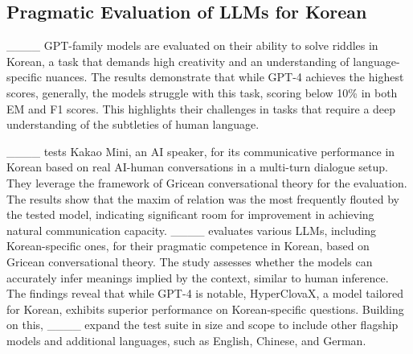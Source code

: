 \subsection*{Pragmatic Evaluation of LLMs for Korean}


____ GPT-family models are evaluated on their ability to solve riddles in Korean, a task that demands high creativity and an understanding of language-specific nuances. The results demonstrate that while GPT-4 achieves the highest scores, generally, the models struggle with this task, scoring below 10\% in both EM and F1 scores. This highlights their challenges in tasks that require a deep understanding of the subtleties of human language.

____ tests Kakao Mini, an AI speaker, for its communicative performance in Korean based on real AI-human conversations in a multi-turn dialogue setup. They leverage the framework of Gricean conversational theory for the evaluation. The results show that the maxim of relation was the most frequently flouted by the tested model, indicating significant room for improvement in achieving natural communication capacity. ____ evaluates various LLMs, including Korean-specific ones, for their pragmatic competence in Korean, based on Gricean conversational theory. The study assesses whether the models can accurately infer meanings implied by the context, similar to human inference. The findings reveal that while GPT-4 is notable, HyperClovaX, a model tailored for Korean, exhibits superior performance on Korean-specific questions. Building on this, ____ expand the test suite in size and scope to include other flagship models and additional languages, such as English, Chinese, and German.